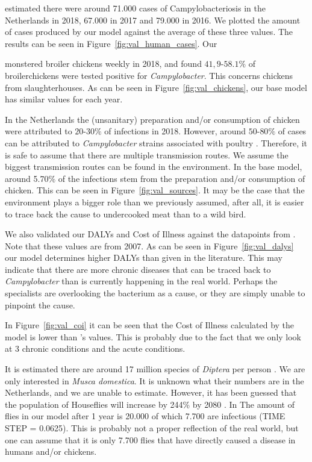 \textcite{vlaanderen_staat_2019} estimated there were around 71.000 cases of Campylobacteriosis in the Netherlands in 2018, 67.000 in 2017 and 79.000 in 2016. We plotted the amount of cases produced by our model against the average of these three values. The results can be seen in Figure~\ref{fig:val_human_cases}. Our 

\textcite{nepluvi_rapportage_2019} monstered broiler chickens weekly in 2018, and found $41,9$-$58.1\%$ of broilerchickens were tested positive for \textit{Campylobacter}. This concerns chickens from slaughterhouses. As can be seen in Figure~\ref{fig:val_chickens}, our base model has similar values for each year.

In the Netherlands the (unsanitary) preparation and/or consumption of chicken were attributed to $20$-$30\%$ of infections in 2018. However, around $50$-$80\%$ of cases can be attributed to \textit{Campylobacter} strains associated with poultry \parencite{cuperus_surveillance_2020, nepluvi_rapportage_2019}. Therefore, it is safe to assume that there are multiple transmission routes. We assume the biggest transmission routes can be found in the environment. In the base model, around 5.70\% of the infections stem from the preparation and/or consumption of chicken. This can be seen in Figure~\ref{fig:val_sources}. It may be the case that the environment plays a bigger role than we previously assumed, after all, it is easier to trace back the cause to undercooked meat than to a wild bird.

We also validated our DALYs and Cost of Illness against the datapoints from \parencite{mangen_campylobacteriosis_2007}. Note that these values are from 2007. As can be seen in Figure~\ref{fig:val_dalys} our model determines higher DALYs than given in the literature. This may indicate that there are more chronic diseases that can be traced back to \textit{Campylobacter} than is currently happening in the real world. Perhaps the specialists are overlooking the bacterium as a cause, or they are simply unable to pinpoint the cause.

In Figure~\ref{fig:val_coi} it can be seen that the Cost of Illness calculated by the model is lower than \citeauthor{mangen_campylobacteriosis_2007}'s values. This is probably due to the fact that we only look at 3 chronic conditions and the acute conditions. 

It is estimated there are around 17 million species of \textit{Diptera} per person \parencite{gorman_trillions_2017}. We are only interested in \textit{Musca domestica}. It is unknown what their numbers are in the Netherlands, and we are unable to estimate. However, it has been guessed that the population of Houseflies will increase by 244\% by 2080 \parencite{mcalister_secret_2017}. In The amount of flies in our model after 1 year is 20.000 of which 7.700 are infectious (TIME STEP = 0.0625). This is probably not a proper reflection of the real world, but one can assume that it is only 7.700 flies that have directly caused a disease in humans and/or chickens.

